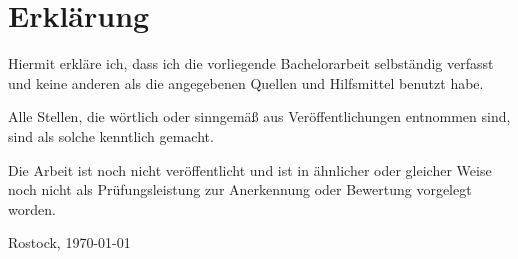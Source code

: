 \chapter*{Erklärung}
Hiermit erkläre ich, dass ich die vorliegende Bachelorarbeit selbständig verfasst und keine anderen als die angegebenen Quellen und Hilfsmittel benutzt habe.

Alle Stellen, die wörtlich oder sinngemäß aus Veröffentlichungen entnommen sind, sind als solche kenntlich gemacht.

Die Arbeit ist noch nicht veröffentlicht und ist in ähnlicher oder gleicher Weise noch nicht als Prüfungsleistung zur Anerkennung oder Bewertung vorgelegt worden.

Rostock, \today
\\
 \\
\\
\begin{Form}
\end{Form}